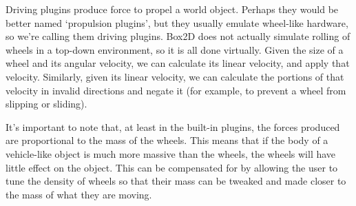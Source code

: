 \documentclass[letterpaper,10pt,english]{sphinxmanual}
\begin{document}

Driving plugins produce force to propel a world object. Perhaps they would be better
named ‘propulsion plugins’, but they usually emulate wheel-like hardware, so we’re
calling them driving plugins. Box2D does not actually simulate rolling of wheels in
a top-down environment, so it is all done virtually. Given the size of a wheel and its
angular velocity, we can calculate its linear velocity, and apply that velocity.
Similarly, given its linear velocity, we can calculate the portions of that velocity
in invalid directions and negate it (for example, to prevent a wheel from slipping or
sliding).

It’s important to note that, at least in the built-in plugins, the forces produced are
proportional to the mass of the wheels. This means that if the body of a vehicle-like
object is much more massive than the wheels, the wheels will have little effect on the
object. This can be compensated for by allowing the user to tune the density of wheels
so that their mass can be tweaked and made closer to the mass of what they are moving.
\end{document}
